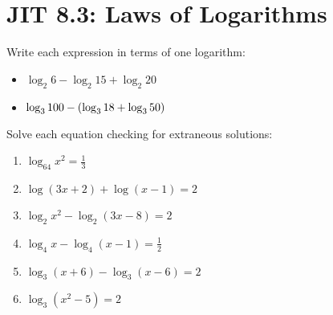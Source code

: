 \documentclass[mathNotesPreamble]{subfiles}
\begin{document}
\section{JIT 8.3: Laws of Logarithms}
  \begin{ex*}
    Write each expression in terms of one logarithm:\\
    
    \noindent
    \begin{minipage}{0.6\linewidth}
      \begin{itemize}
        \item[] $\log_2 6-\log_2 15+\log_2 20$\\[50pt]
        \item[] $\log_3 100-{\left(\log_3 18+\log_3 50\right)}$\\[50pt]
      \end{itemize}
    \end{minipage}%
    \begin{minipage}{0.4\linewidth}
      \begin{flushright}
      \end{flushright}
    \end{minipage}
  \end{ex*}
  \pagebreak
  \begin{ex*}
    Solve each equation checking for extraneous solutions:
    \begin{enumerate}[label=, itemsep=\stretch{1}]
      \item $\log_{64}x^2=\frac{1}{3}$
      \item $\log(3x+2)+\log(x-1)=2$
      \item $\log_2 x^2-\log_2(3x-8)=2$
      \item $\log_4 x-\log_4(x-1)=\frac{1}{2}$
      \item $\log_3(x+6)-\log_3(x-6)=2$
      \item $\log_3(x^2-5)=2$
    \end{enumerate}
  \end{ex*}
  \pagebreak
\end{document}
